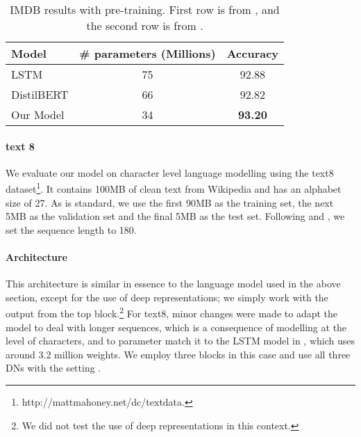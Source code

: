 \documentclass{article}
\begin{document}
\begin{table}
\caption{IMDB results with pre-training. First row is from \citet{radford2017learning}, and the second row is from \citet{sanh2019distilbert}.}
\label{table: Amazon, IMDB}
\begin{center}
\begin{tabular}{lcc}
\hline\noalign{\smallskip}
Model & \# parameters (Millions) & Accuracy \\
\hline\noalign{\smallskip}
LSTM        &  75         &  92.88         \\
DistilBERT  &  66         & 92.82          \\
Our Model   &  34         & {\bf 93.20}    \\
\hline
\end{tabular}
\end{center}
\end{table}

\paragraph{text 8} We evaluate our model on character level language modelling using the text8 dataset\footnote{http://mattmahoney.net/dc/textdata.}. It contains 100MB of clean text from Wikipedia and has an alphabet size of 27. As is standard, we use the first 90MB as the training set, the next 5MB as the validation set and the final 5MB as the test set. Following \citet{mikolov2012subword} and \citet{zhang2016architectural}, we set the sequence length to 180.

\paragraph{Architecture} This architecture is similar in essence to the language model used in the above section, except for the use of deep representations; we simply work with the output from the top block.\footnote{We did not test the use of deep representations in this context.} For text8, minor changes were made to adapt the model to deal with longer sequences, which is a consequence of modelling at the level of characters, and to parameter match it to the LSTM model in \citet{zhang2016architectural}, which uses around 3.2 million weights. We employ three blocks in this case and use all three DNs with the setting . 
\end{document}
